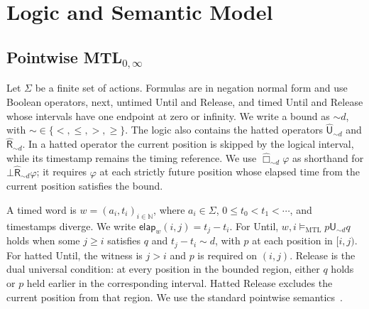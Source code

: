\documentclass{ieeeaccess}
\newcommand{\Nat}{\mathbb{N}}
\newcommand{\satM}{\models_{\mathrm{MTL}}}
\newcommand{\Until}{\mathbin{\mathsf{U}}}
\newcommand{\hUntil}{\mathbin{\widehat{\mathsf{U}}}}
\newcommand{\hRelease}{\mathbin{\widehat{\mathsf{R}}}}
\newcommand{\elapsed}{\mathsf{elap}}
\begin{document}
\section{Logic and Semantic Model}
\label{sec:logic}
\subsection{Pointwise MTL$_{0,\infty}$}
\label{sec:mtl}
Let $\Sigma$ be a finite set of actions. Formulas are in negation normal
form and use Boolean operators, next, untimed Until and Release, and timed
Until and Release whose intervals have one endpoint at zero or infinity.
We write a bound as $\sim d$, with $\sim\in\{<,\le,>,\ge\}$. The logic also
contains the hatted operators $\hUntil_{\sim d}$ and
$\hRelease_{\sim d}$. In a hatted operator the current position is skipped
by the logical interval, while its timestamp remains the timing reference.
We use $\widehat{\Box}_{\sim d}\varphi$ as shorthand for
$\bot\hRelease_{\sim d}\varphi$; it requires $\varphi$ at each strictly
future position whose elapsed time from the current position satisfies the
bound.

A timed word is $w=(a_i,t_i)_{i\in\Nat}$, where $a_i\in\Sigma$,
$0\le t_0<t_1<\cdots$, and timestamps diverge. We write
$\elapsed_w(i,j)=t_j-t_i$. For Until, $w,i\satM p\Until_{\sim d}q$
holds when some $j\ge i$ satisfies $q$ and $t_j-t_i\sim d$, with $p$ at
each position in $[i,j)$. For hatted Until, the witness is $j>i$ and $p$
is required on $(i,j)$. Release is the dual universal condition: at every
position in the bounded region, either $q$ holds or $p$ held earlier in the
corresponding interval. Hatted Release excludes the current position from
that region. We use the standard pointwise semantics~\cite{MTLsem}.
\end{document}
